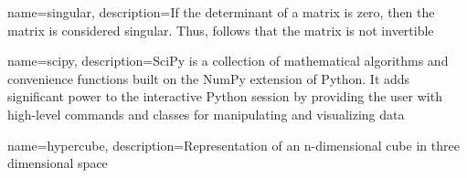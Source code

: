 {
    name=singular,
    description={If the determinant of a matrix is zero, then the matrix is considered singular. Thus, follows that the matrix is not invertible}
}

{
    name=scipy,
    description={SciPy is a collection of mathematical algorithms and convenience functions built on the NumPy extension of Python. It adds significant power to the interactive Python session by providing the user with high-level commands and classes for manipulating and visualizing data \cite{2020SciPy}}
}


{
    name=hypercube,
    description={Representation of an n-dimensional cube in three dimensional space \cite{bowen1982hypercube}}
}
